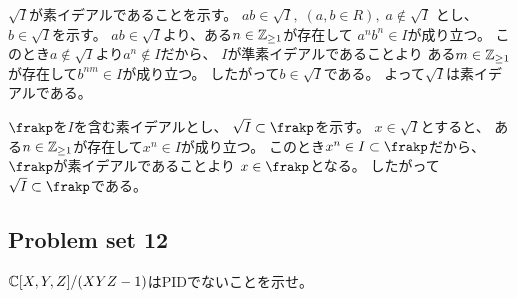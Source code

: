 \documentclass[report]{jlreq}
\begin{document}
\begin{answer}
    $\sqrt{I}$が素イデアルであることを示す。
    $ab \in \sqrt{I}, \; (a, b \in R), \;
        a \notin \sqrt{I}$
    とし、$b \in \sqrt{I}$を示す。
    $ab \in \sqrt{I}$より、ある$n \in \mathbb{Z}_{\ge 1}$が存在して
    $a^n b^n \in I$が成り立つ。
    このとき$a \notin \sqrt{I}$より$a^n \notin I$だから、
    $I$が準素イデアルであることより
    ある$m \in \mathbb{Z}_{\ge 1}$が存在して$b^{nm} \in I$が成り立つ。
    したがって$b \in \sqrt{I}$である。
    よって$\sqrt{I}$は素イデアルである。

    $\frakp$を$I$を含む素イデアルとし、
    $\sqrt{I} \subset \frakp$を示す。
    $x \in \sqrt{I}$とすると、
    ある$n \in \mathbb{Z}_{\ge 1}$が存在して$x^n \in I$が成り立つ。
    このとき$x^n \in I \subset \frakp$だから、
    $\frakp$が素イデアルであることより
    $x \in \frakp$となる。
    したがって$\sqrt{I} \subset \frakp$である。
\end{answer}

\subsection{Problem set 12}

\begin{problem}[代数学II 12.151]
    $\mathbb{C}[X, Y, Z] / (XYZ - 1)$はPIDでないことを示せ。
\end{problem}
\end{document}
